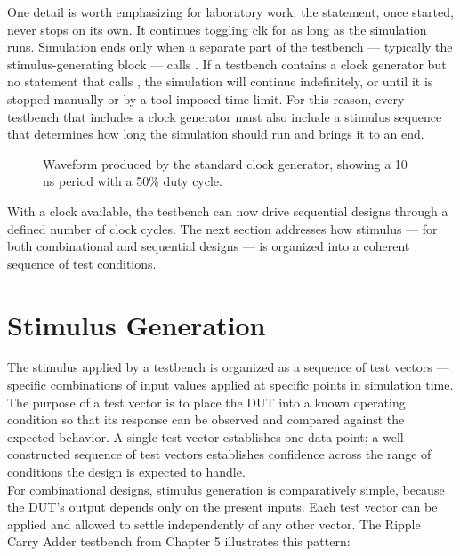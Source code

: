 \noindent One detail is worth emphasizing for laboratory work: the  statement, once started, never stops on its own. It continues toggling clk for as long as the simulation runs. Simulation ends only when a separate part of the testbench — typically the stimulus-generating  block — calls . If a testbench contains a clock generator but no statement that calls , the simulation will continue indefinitely, or until it is stopped manually or by a tool-imposed time limit. For this reason, every testbench that includes a clock generator must also include a stimulus sequence that determines how long the simulation should run and brings it to an end.\\ 


\begin{figure}[H]
    \centering
    \caption{Waveform produced by the standard clock generator, showing a 10 ns period with a 50\% duty cycle.}
    \label{fig:clock_waveform}
\end{figure}

With a clock available, the testbench can now drive sequential designs through a defined number of clock cycles. The next section addresses how stimulus — for both combinational and sequential designs — is organized into a coherent sequence of test conditions.

\section{Stimulus Generation}
The stimulus applied by a testbench is organized as a sequence of test vectors — specific combinations of input values applied at specific points in simulation time. The purpose of a test vector is to place the DUT into a known operating condition so that its response can be observed and compared against the expected behavior. A single test vector establishes one data point; a well-constructed sequence of test vectors establishes confidence across the range of conditions the design is expected to handle.\\


\noindent For combinational designs, stimulus generation is comparatively simple, because the DUT's output depends only on the present inputs. Each test vector can be applied and allowed to settle independently of any other vector. The Ripple Carry Adder testbench from Chapter 5 illustrates this pattern:

